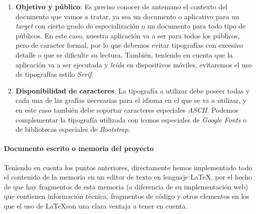 \documentclass[../ei103948-project-documentation.tex]{subfiles}
\begin{document}
                                \begin{enumerate}
                                    \item \textbf{Objetivo y público}: Es preciso conocer de antemano el contexto del documento que vamos a tratar, ya sea un documento o aplicativo para un \textit{target} con cierto grado de especialización o un documento para todo tipo de públicos. En este caso, nuestra aplicación va a ser para todos los públicos, pero de caracter formal, por lo que debemos evitar tipografías con excesivo detalle o que se dificulte su lectura. También, teniendo en cuenta que la aplicación va a ser ejecutada y \textit{leída} en dispositivos móviles, evitaremos el uso de tipografías estilo \textit{Serif}.
                                    \item \textbf{Disponibilidad de caracteres}: La tipografía a utilizar debe poseer todas y cada una de las grafías necesarias para el idioma en el que se va a utilizar, y en este caso también debe soportar caracteres especiales \textit{ASCII}. Podemos complementar la tipografía utilizada con iconos especiales de \textit{Google Fonts} o de bibliotecas especiales de \textit{Bootstrap}.
                                \end{enumerate}
                    
                            \paragraph*{Documento escrito o memoria del proyecto}
                            Teniendo en cuenta los puntos anteriores, directamente hemos implementado todo el contenido de la memoria en un editor de texto en lenguaje \LaTeX, por el hecho de que hay fragmentos de esta memoria (a diferencia de su implementación web) que contienen información técnica, fragmentos de código y otros elementos en los que el uso de \LaTeX son una clara ventaja a tener en cuenta.\\
                    
\end{document}
